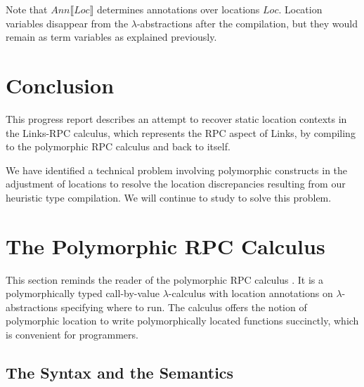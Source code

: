 \documentclass[a4paper]{article}
\theoremstyle{plain}
\theoremstyle{definition}
\newcommand{\anncomp}[1]{Ann\llbracket#1\rrbracket}
\newcommand{\Loc}{Loc}
\begin{document}
%
Note that $\anncomp{\Loc}$ determines annotations over locations
$\Loc$.
%
Location variables disappear from the $\lambda$-abstractions after the
compilation, but they would remain as term variables as explained
previously.

\section{Conclusion}
\label{sec:conclusion}

%
This progress report describes an attempt to recover static location
contexts in the Links-RPC calculus, which represents the RPC aspect of
Links, by compiling to the polymorphic RPC calculus and back to
itself.

%
We have identified a technical problem involving polymorphic
constructs in the adjustment of locations to resolve the location
discrepancies resulting from our heuristic type compilation.
%
We will continue to study to solve this problem. 

	

	
\appendix
	
\section{The Polymorphic RPC Calculus}
\label{app:1}

This section reminds the reader of the polymorphic RPC calculus
\cite{CHOI:scp2020}.
%
It is a polymorphically typed call-by-value $\lambda$-calculus with
location annotations on $\lambda$-abstractions specifying where to
run.
%
The calculus offers the notion of polymorphic location to write
polymorphically located functions succinctly, which is convenient for
programmers.

\subsection{The Syntax and the Semantics}
\label{sec:polyrpc:syntax&semantics}
\end{document}
